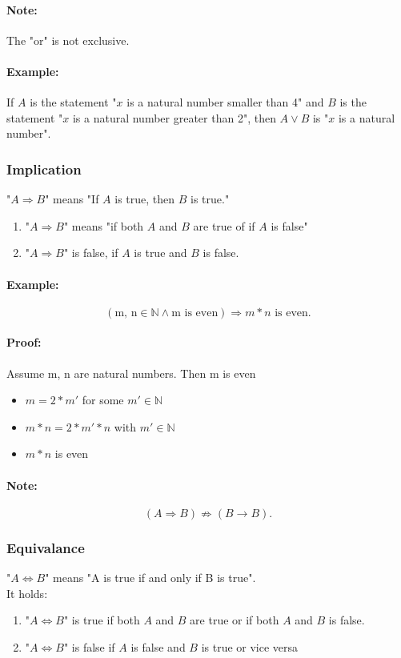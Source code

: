\documentclass[twocolumn]{article}
\begin{document}
			\paragraph{Note:}
				The "or" is not exclusive.

			\paragraph{Example:}
				If $A$ is the statement "$x$ is a natural number smaller than
				4" and $B$ is the statement "$x$ is a natural number greater
				 than 2", then $A\vee B$ is "$x$ is a natural number".

		\subsubsection{Implication}
			"$A\Rightarrow B$" means "If $A$ is true, then $B$ is true."
			\begin{enumerate}
			\item "$A\Rightarrow B$" means "if both $A$ and $B$ are true of if $A$ 
				is false"
			\item "$A\Rightarrow B$" is false, if $A$ is true and $B$ is false.	
			\end{enumerate}

			\paragraph{Example:}
				\[
				(\mbox{m, n}\in\mathbb N\wedge\mbox{m is even})
				\Rightarrow m*n \mbox{ is even}
				.\] 
			\paragraph{Proof:}
				Assume m, n are natural numbers. Then m is even
				\begin{itemize}%
				\renewcommand{\labelitemi}{$\Rightarrow$}
				\item $m=2*m'$ for some $m'\in\mathbb N$
				\item $m*n=2*m'*n$ with $m'\in\mathbb N$
				\item $m*n$ is even				
				\end{itemize}
			\paragraph{Note:}
				\[
					(A\Rightarrow B)\not\Rightarrow(B\rightarrow B)
				.\] 

		\subsubsection{Equivalance}
			"$A\Leftrightarrow B$" means "A is true if and only if B is true".\\
			It holds:
			\begin{enumerate}
			\item "$A\Leftrightarrow B$" is true if both $A$ and $B$ are true
				or if both $A$ and $B$ is false.
			\item "$A\Leftrightarrow B$" is false if $A$ is false and $B$
				is true or vice versa
			\end{enumerate}
\end{document}
